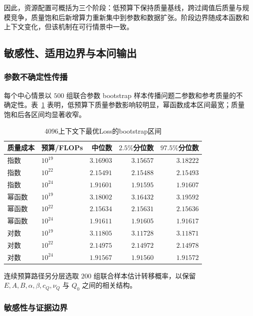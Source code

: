 因此，资源配置可概括为三个阶段：低预算下保持质量基线，跨过阈值后质量与规模竞争，质量饱和后新增算力重新集中到参数和数据扩张。阶段边界随成本函数和上下文变化，但该机制在可行情景中一致。

\subsection{敏感性、适用边界与本问输出}

\subsubsection{参数不确定性传播}

每个中心情景以 $500$ 组联合参数 bootstrap 样本传播问题二参数和参考质量的不确定性\cite{efron1979bootstrap}。表~\ref{tab:p3_bootstrap_loss} 表明，低预算下质量参数影响较明显，幂函数成本区间最宽；质量饱和后各区间均显著收窄。

\begin{table}[!htbp]
\centering
\caption{4096上下文下最优Loss的bootstrap区间}
\label{tab:p3_bootstrap_loss}
\small
\setlength{\tabcolsep}{6pt}
\begin{tabular}{llrrr}
\toprule
质量成本 & 预算/FLOPs & 中位数 & $2.5\%$分位数 & $97.5\%$分位数 \\
\midrule
指数 & $10^{19}$ & $3.16903$ & $3.15657$ & $3.18222$ \\
指数 & $10^{22}$ & $2.15491$ & $2.15488$ & $2.15493$ \\
指数 & $10^{24}$ & $1.91601$ & $1.91595$ & $1.91607$ \\
\midrule
幂函数 & $10^{19}$ & $3.18002$ & $3.16432$ & $3.19592$ \\
幂函数 & $10^{22}$ & $2.15634$ & $2.15631$ & $2.15636$ \\
幂函数 & $10^{24}$ & $1.91611$ & $1.91605$ & $1.91617$ \\
\midrule
对数 & $10^{19}$ & $3.11805$ & $3.11728$ & $3.11871$ \\
对数 & $10^{22}$ & $2.14975$ & $2.14972$ & $2.14978$ \\
对数 & $10^{24}$ & $1.91567$ & $1.91560$ & $1.91572$ \\
\bottomrule
\end{tabular}
\end{table}

连续预算路径另分层选取 $200$ 组联合样本估计转移概率，以保留 $E,A,B,\alpha,\beta,c_Q,\nu_Q$ 与 $Q_0$ 之间的相关结构。

\subsubsection{敏感性与证据边界}

